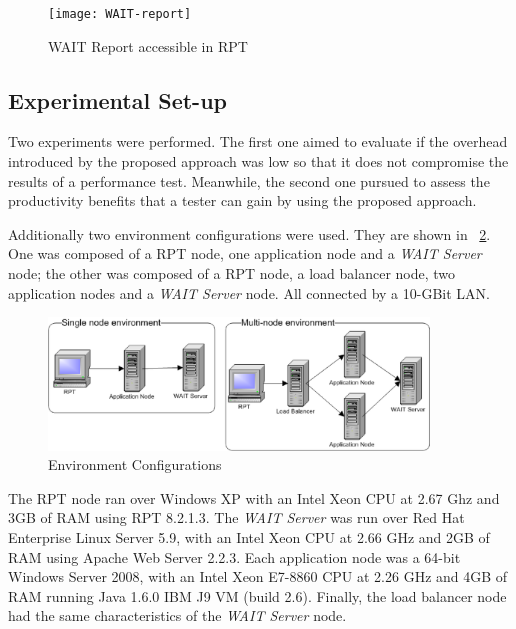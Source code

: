 \documentclass[runningheads,a4paper]{llncs}
\begin{document}

\begin{figure}[!h]
\centering
\texttt{[image: WAIT-report]}
\caption{WAIT Report accessible in RPT}
\label{fig_report}
\end{figure}

\vspace{-7pt}
\subsection{Experimental Set-up}
\vspace{-7pt}
Two experiments were performed. The first one aimed to evaluate if the overhead
introduced by the proposed approach was low so that it does not compromise the
results of a performance test. Meanwhile, the second one pursued to
assess the productivity benefits that a tester can gain by using the proposed
approach.

Additionally two environment configurations were used. They are shown in
\figurename ~\ref{fig_env}. One was composed of a RPT node, one application node
and a \emph{WAIT Server} node; the other was composed of a RPT node, a load
balancer node, two application nodes and a \emph{WAIT Server} node. All
connected by a 10-GBit LAN.

\begin{figure}[!h]
\centering
\includegraphics[totalheight=.15\textheight,width=0.9\textwidth]{Environments}
\caption{Environment Configurations}
\label{fig_env}
\end{figure}

The RPT node ran over Windows XP with an Intel Xeon CPU at
2.67 Ghz and 3GB of RAM using RPT 8.2.1.3. The \emph{WAIT Server} was run over
Red Hat Enterprise Linux Server 5.9, with an Intel Xeon CPU at 2.66 GHz and 2GB of
RAM using Apache Web Server 2.2.3. Each application node was a 64-bit Windows
Server 2008, with an Intel Xeon E7-8860 CPU at 2.26 GHz and 4GB of RAM
running Java 1.6.0 IBM J9 VM (build 2.6). Finally, the load balancer node had
the same characteristics of the \emph{WAIT Server} node. 
\end{document}
